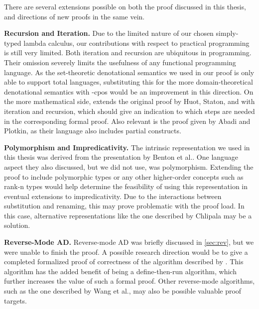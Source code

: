 There are several extensions possible on both the proof discussed in this thesis, and directions of new proofs in the same vein.

\textbf{Recursion and Iteration.} Due to the limited nature of our chosen simply-typed lambda calculus, our contributions with respect to practical programming is still very limited.
Both iteration and recursion are ubiquitous in programming.
Their omission severely limits the usefulness of any functional programming language.
As the set-theoretic denotational semantics we used in our proof is only able to support total languages, substituting this for the more domain-theoretical denotational semantics with \omega-cpos would be an improvement in this direction.
On the more mathematical side, \Vakar{}\cite{vkr2020denotational} extends the original proof by Huot, Staton, and \Vakar{}\cite{huot2020correctness} with iteration and recursion, which should give an indication to which steps are needed in the corresponding formal proof.
Also relevant is the proof given by Abadi and Plotkin\cite{10.1145/3371106}, as their language also includes partial constructs.

\textbf{Polymorphism and Impredicativity.} The intrinsic representation we used in this thesis was derived from the presentation by Benton et al.\cite{Benton2011}.
One language aspect they also discussed, but we did not use, was polymorphism.
Extending the proof to include polymorphic types or any other higher-order concepts such as rank-n types would help determine the feasibility of using this representation in eventual extensions to impredicativity.
Due to the interactions between substitution and renaming, this may prove problematic with the proof load.
In this case, alternative representations like the one described by Chlipala\cite{10.1145/1411203.1411226} may be a solution.

\textbf{Reverse-Mode AD.} Reverse-mode AD was briefly discussed in \cref{sec:rev}, but we were unable to finish the proof.
A possible research direction would be to give a completed formalized proof of correctness of the algorithm described by \Vakar{}\cite{vkr2020reverse}.
This algorithm has the added benefit of being a define-then-run algorithm, which further increases the value of such a formal proof.
Other reverse-mode algorithms, such as the one described by Wang et al.\cite{ShiftReset:Backprop}, may also be possible valuable proof targets.
